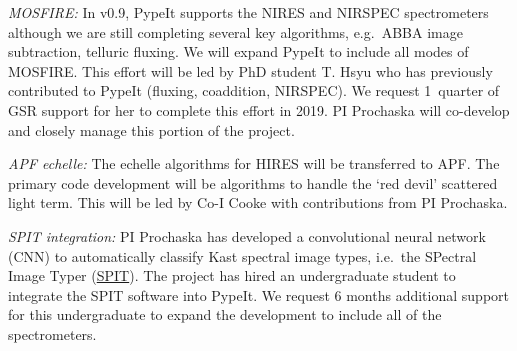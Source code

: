 \documentclass[12pt,preprint]{aastex}
\begin{document}
\vskip 0.05in

\noindent 
{\it MOSFIRE:}
In v0.9, PypeIt supports the NIRES and NIRSPEC spectrometers
although we are still completing several
key algorithms, e.g.\  ABBA image subtraction,
telluric fluxing.  We will expand PypeIt to include all
modes of MOSFIRE.
This effort will be led by PhD student
T. Hsyu who has previously contributed to PypeIt
(fluxing, coaddition, NIRSPEC).
We request 1~quarter of GSR support for her to 
complete this effort in 2019.  PI Prochaska will co-develop
and closely manage this portion of the project.


\vskip 0.05in

\noindent 
{\it APF echelle:}   
The echelle algorithms for HIRES will be transferred
to APF.  The primary code development will be algorithms
to handle the `red devil' scattered light term.
This will be led by Co-I Cooke with contributions
from PI Prochaska.

\vskip 0.05in

\noindent 
{\it SPIT integration:}   
PI Prochaska has developed a convolutional neural network (CNN)
to automatically classify Kast spectral image types, i.e.\ the
SPectral Image Typer (\href{https://github.com/pypeit/spit}{SPIT}).
The project has hired an undergraduate student to integrate
the SPIT software into PypeIt.  We request 6 months additional
support for this undergraduate to expand the development to
include all of the spectrometers.


\clearpage
\end{document}
